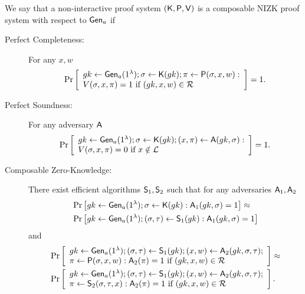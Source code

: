 \begin{definition} We say that a non-interactive proof system $(\mathsf{K},\mathsf{P},\mathsf{V})$ is a composable NIZK proof system with respect to $\mathsf{Gen}_a$ if
\begin{description}
\item[Perfect Completeness:] For any $x,w$
$$
\Pr\left[
\begin{array}{l}
gk\gets\mathsf{Gen}_a(1^\lambda);\sigma\gets\mathsf{K}(gk);\pi\gets\mathsf{P}(\sigma,x,w):\\
V(\sigma,x,\pi)=1 \text{ if } (gk,x,w)\in\mathcal{R}
\end{array}
\right]=1.
$$
\item[Perfect Soundness:] For any adversary $\mathsf{A}$
$$
\Pr\left[
\begin{array}{l}
gk\gets\mathsf{Gen}_a(1^\lambda);\sigma\gets\mathsf{K}(gk);(x,\pi)\gets\mathsf{A}(gk,\sigma):\\
V(\sigma,x,\pi)=0 \text{ if } x\notin\mathcal{L}
\end{array}
\right]=1.
$$
\item[Composable Zero-Knowledge:] There exist efficient algorithms $\mathsf{S}_1,\mathsf{S}_2$ such that for any adversaries $\mathsf{A}_1,\mathsf{A}_2$
\begin{align*}
&\Pr\left[
gk\gets\mathsf{Gen}_a(1^\lambda);\sigma\gets\mathsf{K}(gk):
\mathsf{A}_1(gk,\sigma)=1
\right]\approx\\
&\Pr\left[
gk\gets\mathsf{Gen}_a(1^\lambda);(\sigma,\tau)\gets\mathsf{S}_1(gk):
\mathsf{A}_1(gk,\sigma)=1
\right]
\end{align*}
and
\begin{align*}
&\Pr\left[
\begin{array}{l}
gk\gets\mathsf{Gen}_a(1^\lambda);(\sigma,\tau)\gets\mathsf{S}_1(gk);(x,w)\gets\mathsf{A}_2(gk,\sigma,\tau);\\
\pi\gets\mathsf{P}(\sigma,x,w):\mathsf{A}_2(\pi)=1\text{ if }(gk,x,w)\in\mathcal{R}
\end{array}
\right]\approx\\
&\Pr\left[
\begin{array}{l}
gk\gets\mathsf{Gen}_a(1^\lambda);(\sigma,\tau)\gets\mathsf{S}_1(gk);(x,w)\gets\mathsf{A}_2(gk,\sigma,\tau);\\
\pi\gets\mathsf{S}_2(\sigma,\tau,x):\mathsf{A}_2(\pi)=1\text{ if }(gk,x,w)\in\mathcal{R}
\end{array}
\right].
\end{align*}
\end{description}
\end{definition}

